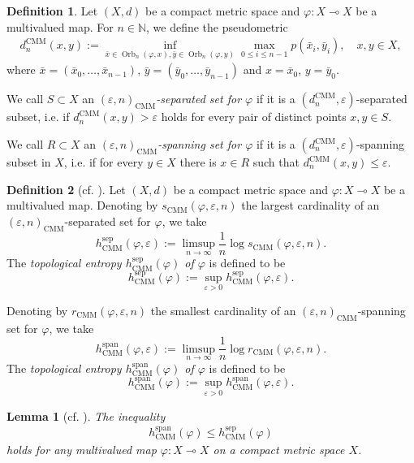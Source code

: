 \documentclass[12pt]{amsart}
\newtheorem{lemma}{Lemma}
\theoremstyle{definition}
\newtheorem{definition}{Definition}
\newcommand\N{\mathbb{N}}
\newcommand{\vp}{\varphi}
\newcommand{\ep}{{\varepsilon}}
\newcommand{\spa}{\operatorname{span}}
\newcommand{\sepp}{\operatorname{sep}}
\newcommand{\orbn}{{\operatorname{Orb}_n}}
\newcommand{\CM}{\operatorname{CMM}}
\newcommand{\hCM}{h_{\CM}}
\begin{document}
\begin{definition}
Let $(X,d)$ be a compact metric space and $\vp:X\multimap X$ be a  multivalued map. For $n\in\N$, we define the pseudometric
\begin{align*}
d_n^{\CM}(x,y) := \inf_{\bar{x}\in\orbn(\vp,x),\bar{y}\in\orbn(\vp,y)} \max_{0\leq i \leq n-1} p(\bar{x}_i,\bar{y}_i), \quad x,y\in X,
\end{align*}
where $\bar{x}=(\bar{x}_0,\ldots,\bar{x}_{n-1})$, $\bar{y}=(\bar{y}_0,\ldots,\bar{y}_{n-1})$ and $x=\bar{x}_0$, $y=\bar{y}_0$.

We call $S\subset X$ an \emph{$(\ep,n)_{\CM}$-separated set for $\vp$} if it is a $(d_n^{\CM},\ep)$-separated subset, i.e. if $d^{\CM}_n(x,y)>\ep$ holds for every pair of distinct points $x,y\in S$. 

We call $R\subset X$ an \emph{$(\ep,n)_{\CM}$-spanning set for $\vp$} if it is a $(d_n^{\CM},\ep)$-spanning subset in $X$, i.e. if for every $y\in X$ there is $x\in R$ such that $d^{\CM}_n(x,y)\leq\ep$.
\end{definition}

\begin{definition}[cf. \cite{CMM1}]\label{d:9}
Let $(X,d)$ be a compact metric space and $\vp: X\multimap X$ be a multivalued map. Denoting by $s_{\CM}(\vp,\ep,n)$ the largest cardinality of an $(\ep,n)_{\CM}$-separated set for $\vp$, we take
\begin{equation*}
\hCM^{\sepp}(\vp,\ep) := \limsup_{n\to\infty} \frac1{n}\log s_{\CM}(\vp,\ep,n).
\end{equation*}
The \emph{topological entropy $\hCM^{\sepp}(\vp)$ of $\vp$} is defined to be
\begin{equation*}
\hCM^{\sepp}(\vp):= \sup_{\ep>0} \hCM^{\sepp}(\vp,\ep).
\end{equation*}

Denoting by $r_{\CM}(\vp,\ep,n)$ the smallest cardinality of an $(\ep,n)_{\CM}$-spanning set for $\vp$, we take
\begin{equation*}
\hCM^{\spa}(\vp,\ep) := \limsup_{n\to\infty} \frac1{n}\log r_{\CM}(\vp,\ep,n).
\end{equation*}
The \emph{topological entropy $\hCM^{\spa}(\vp)$ of $\vp$} is defined to be
\begin{equation*}
\hCM^{\spa}(\vp):= \sup_{\ep>0} \hCM^{\spa}(\vp,\ep).
\end{equation*}
\end{definition}

\begin{lemma}[cf. {\cite[Theorem 3.5]{CMM1}}]\label{l:5}
The inequality
\begin{align}\label{eq:A4}
\hCM^{\spa}(\vp)\leq \hCM^{\sepp}(\vp)
\end{align}
holds for any multivalued map $\vp:X\multimap X$ on a compact metric space $X$.
\end{lemma}
\end{document}
